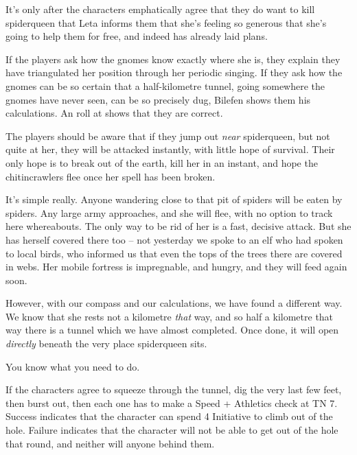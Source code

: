 It's only after the characters emphatically agree that they do want to kill \gls{spiderqueen} that Leta informs them that she's feeling so generous that she's going to help them for free, and indeed has already laid plans.

If the players ask how the gnomes know exactly where she is, they explain they have triangulated her position through her periodic singing.
If they ask how the gnomes can be so certain that a half-kilometre tunnel, going somewhere the gnomes have never seen, can be so precisely dug, Bilefen shows them his calculations.
An  roll at \tn[11] shows that they are correct.

The players should be aware that if they jump out \emph{near} \gls{spiderqueen}, but not quite at her, they will be attacked instantly, with little hope of survival.
Their only hope is to break out of the earth, kill her in an instant, and hope the chitincrawlers flee once her spell has been broken.

\begin{speechtext}

  It's simple really.
  Anyone wandering close to that pit of spiders will be eaten by spiders.
  Any large army approaches, and she will flee, with no option to track here whereabouts.
  The only way to be rid of her is a fast, decisive attack.
  But she has herself covered there too -- not yesterday we spoke to an elf who had spoken to local birds, who informed us that even the tops of the trees there are covered in webs.
  Her mobile fortress is impregnable, and hungry, and they will feed again soon.

  However, with our compass and our calculations, we have found a different way.
  We know that she rests not a kilometre \emph{that} way, and so half a kilometre that way there is a tunnel which we have almost completed.
  Once done, it will open \emph{directly} beneath the very place \gls{spiderqueen} sits.

  You know what you need to do.

\end{speechtext}

If the characters agree to squeeze through the tunnel, dig the very last few feet, then burst out, then each one has to make a Speed + Athletics check at TN 7.
Success indicates that the character can spend 4 Initiative to climb out of the hole.
Failure indicates that the character will not be able to get out of the hole that round, and neither will anyone behind them.


